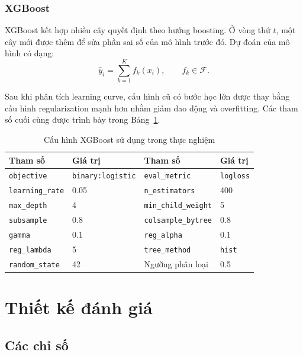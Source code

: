 \documentclass[12pt,a4paper]{article}
\begin{document}
\subsubsection{XGBoost}

XGBoost kết hợp nhiều cây quyết định theo hướng boosting. Ở vòng thứ $t$, một cây mới được thêm để sửa phần sai số của mô hình trước đó. Dự đoán của mô hình có dạng:
\begin{equation}
    \hat{y}_i=\sum_{k=1}^{K} f_k(x_i), \qquad f_k\in\mathcal{F}.
\end{equation}

Sau khi phân tích learning curve, cấu hình cũ có bước học lớn được thay bằng cấu hình regularization mạnh hơn nhằm giảm dao động và overfitting. Các tham số cuối cùng được trình bày trong Bảng~\ref{tab:xgb-params}.

\begin{table}[H]
    \centering
    \begin{tabular}{llll}
        \toprule
        \textbf{Tham số} & \textbf{Giá trị} & \textbf{Tham số} & \textbf{Giá trị} \\
        \midrule
        \texttt{objective} & \texttt{binary:logistic} & \texttt{eval\_metric} & \texttt{logloss} \\
        \texttt{learning\_rate} & 0.05 & \texttt{n\_estimators} & 400 \\
        \texttt{max\_depth} & 4 & \texttt{min\_child\_weight} & 5 \\
        \texttt{subsample} & 0.8 & \texttt{colsample\_bytree} & 0.8 \\
        \texttt{gamma} & 0.1 & \texttt{reg\_alpha} & 0.1 \\
        \texttt{reg\_lambda} & 5 & \texttt{tree\_method} & \texttt{hist} \\
        \texttt{random\_state} & 42 & Ngưỡng phân loại & 0.5 \\
        \bottomrule
    \end{tabular}
    \caption{Cấu hình XGBoost sử dụng trong thực nghiệm}
    \label{tab:xgb-params}
\end{table}

\section{Thiết kế đánh giá}

\subsection{Các chỉ số}
\end{document}
